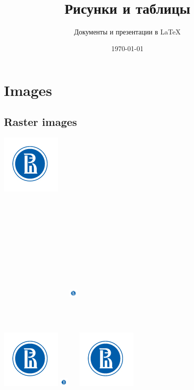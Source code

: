 \documentclass[a4paper,12pt]{article}
\author{Документы и презентации в \LaTeX}
\title{Рисунки и таблицы}
\date{\today}
\begin{document}

\maketitle

\section{Images}

\subsection{Raster images}

\includegraphics{znak.jpg}

\includegraphics[scale=0.5]{znak.jpg}
\includegraphics[width=4mm]{znak.jpg}
\includegraphics[width=4mm, height=10cm, keepaspectratio]{znak.jpg}
\includegraphics[draft]{znak.jpg}
\end{document}
